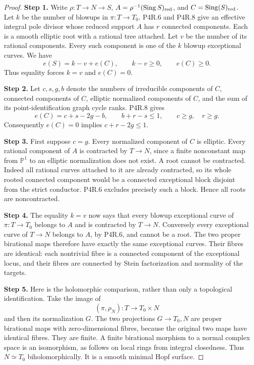 \begin{proof}
\noindent\textbf{Step 1.} Write \(\rho:T\to N\to S\), \(A=\rho^{-1}(\operatorname{Sing}S)_{\rm red}\),
and \(C=\operatorname{Sing}(S)_{\rm red}\). Let \(k\) be the number of
blowups in \(\pi:T\to T_0\). P4R.6 and P4R.8 give an effective integral pole
divisor whose reduced support \(A\) has \(r\) connected components. Each is
a smooth elliptic root with a rational tree attached. Let \(v\) be the
number of its rational components. Every such component is one of the
\(k\) blowup exceptional curves. We have
\[
 e(S)=k-v+e(C),\qquad k-v\ge0,\qquad e(C)\ge0.
\]
Thus equality forces \(k=v\) and \(e(C)=0\).

\noindent\textbf{Step 2.} Let \(c,s,g,b\) denote the numbers of irreducible components of \(C\),
connected components of \(C\), elliptic normalized components of \(C\), and
the sum of its point-identification graph cycle ranks. P4R.8 gives
\[
 e(C)=c+s-2g-b,\qquad
 b+r-s\le1,\qquad c\ge g,\quad r\ge g.
\]
Consequently \(e(C)=0\) implies \(c+r-2g\le1\).

\noindent\textbf{Step 3.} First suppose \(c=g\). Every normalized component of \(C\) is elliptic.
Every rational component of \(A\) is contracted by \(T\to N\), since a
finite nonconstant map from \(\mathbb P^1\) to an elliptic normalization
does not exist. A root cannot be contracted. Indeed all rational curves
attached to it are already contracted, so its whole rooted connected
component would be a connected exceptional block disjoint from the strict
conductor. P4R.6 excludes precisely such a block. Hence all roots are
noncontracted.

\noindent\textbf{Step 4.} The equality \(k=v\) now says that every blowup exceptional curve of
\(\pi:T\to T_0\) belongs to \(A\) and is contracted by \(T\to N\).
Conversely every exceptional curve of \(T\to N\) belongs to \(A\), by
P4R.6, and cannot be a root. The two proper birational maps therefore have
exactly the same exceptional curves. Their fibres are identical: each
nontrivial fibre is a connected component of the exceptional locus, and
their fibres are connected by Stein factorization and normality of the
targets.

\noindent\textbf{Step 5.} Here is the holomorphic comparison, rather than only a topological
identification. Take the image of
\[
 (\pi,\rho_N):T\longrightarrow T_0\times N
\]
and then its normalization \(G\). The two projections \(G\to T_0,N\)
are proper birational maps with zero-dimensional fibres, because the
original two maps have identical fibres. They are finite. A finite
birational morphism to a normal complex space is an isomorphism, as follows
on local rings from integral closedness. Thus \(N\simeq T_0\)
biholomorphically. It is a smooth minimal Hopf surface.


\end{proof}

